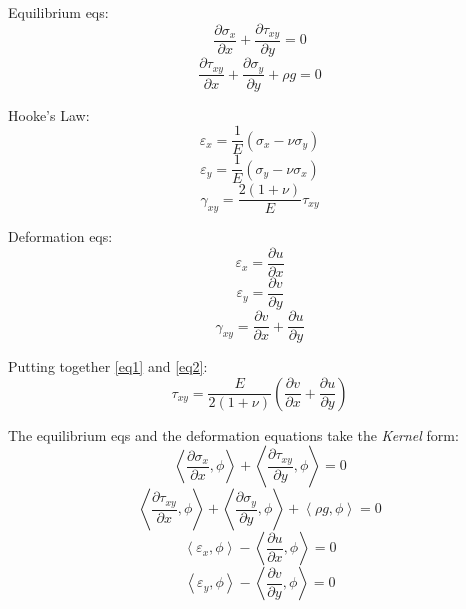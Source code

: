 \documentclass[11pt,letterpaper]{article}
\begin{document}
Equilibrium eqs:
\begin{equation}
\frac{\partial \sigma_x}{\partial x} + \frac{\partial \tau_{xy}}{\partial y} = 0
\end{equation}
\begin{equation}
\frac{\partial \tau_{xy}}{\partial x} + \frac{\partial \sigma_y}{\partial y} + \rho g = 0
\end{equation}

Hooke's Law:
\begin{equation}
\varepsilon_x = \frac{1}{E} (\sigma_x - \nu \sigma_y)
\end{equation}
\begin{equation}
\varepsilon_y = \frac{1}{E} (\sigma_y - \nu \sigma_x)
\end{equation}
\begin{equation}
\gamma_{xy} = \frac{2(1+\nu)}{E} \tau_{xy}
\end{equation}

Deformation eqs:
\begin{equation}
\varepsilon_x = \frac{\partial u}{\partial x}
\end{equation}
\begin{equation}
\varepsilon_y = \frac{\partial v}{\partial y}
\end{equation}
\begin{equation}
\gamma_{xy} = \frac{\partial v}{\partial x} + \frac{\partial u}{\partial y}
\end{equation}

Putting together \ref{eq1} and \ref{eq2}:
\begin{equation}
\tau_{xy} = \frac{E}{2(1+\nu)} (\frac{\partial v}{\partial x} + \frac{\partial u}{\partial y})
\label{eq:eq3}
\end{equation}

The equilibrium eqs and the deformation equations take the \textit{Kernel} form:
\begin{equation}
\left< \frac{\partial \sigma_x}{\partial x}, \phi \right> + \left< \frac{\partial \tau_{xy}}{\partial y}, \phi \right> = 0
\end{equation}
\begin{equation}
\left< \frac{\partial \tau_{xy}}{\partial x}, \phi \right> + \left< \frac{\partial \sigma_{y}}{\partial y}, \phi \right> + \left< \rho g , \phi \right>= 0
\end{equation}
\begin{equation}
\left< \varepsilon_x, \phi \right> - \left< \frac{\partial u}{\partial x}, \phi \right> = 0
\end{equation}
\begin{equation}
\left< \varepsilon_y, \phi \right> - \left< \frac{\partial v}{\partial y}, \phi \right> = 0
\end{equation}
\end{document}

